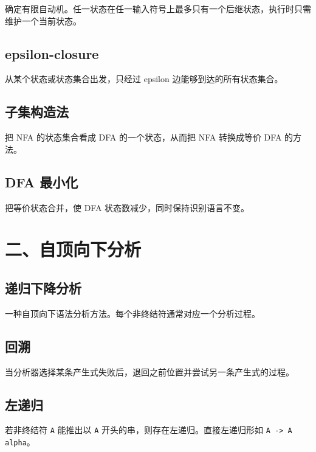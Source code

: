 \documentclass[UTF8,zihao=-4]{ctexart}
\begin{document}
确定有限自动机。任一状态在任一输入符号上最多只有一个后继状态，执行时只需维护一个当前状态。

\subsection*{epsilon-closure}

从某个状态或状态集合出发，只经过 epsilon 边能够到达的所有状态集合。

\subsection*{子集构造法}

把 NFA 的状态集合看成 DFA 的一个状态，从而把 NFA 转换成等价 DFA 的方法。

\subsection*{DFA 最小化}

把等价状态合并，使 DFA 状态数减少，同时保持识别语言不变。

\section*{二、自顶向下分析}

\subsection*{递归下降分析}

一种自顶向下语法分析方法。每个非终结符通常对应一个分析过程。

\subsection*{回溯}

当分析器选择某条产生式失败后，退回之前位置并尝试另一条产生式的过程。

\subsection*{左递归}

若非终结符 \texttt{A} 能推出以 \texttt{A} 开头的串，则存在左递归。直接左递归形如 \texttt{A -> A alpha}。
\end{document}
